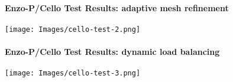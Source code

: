 
\begin{frame}[fragile] 
\secframetitle{\ssTesting}
\framesubtitle{Enzo-P/Cello Test Results: adaptive mesh refinement}
\texttt{[image: Images/cello-test-2.png]}
\end{frame}


\begin{frame}[fragile] 
\secframetitle{\ssTesting}
\framesubtitle{Enzo-P/Cello Test Results: dynamic load balancing}
\texttt{[image: Images/cello-test-3.png]}
\end{frame}

